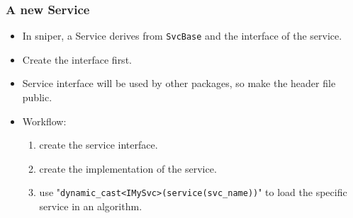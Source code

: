 
\begin{frame}
    \frametitle{A new Service}
    \begin{itemize}
        \item In sniper, a Service derives from {\tt SvcBase} and 
                the interface of the service.
        \item Create the interface first. 
        \item Service interface will be used by other packages, so make the 
                header file public.
        \item Workflow:
        \begin{enumerate}
            \item create the service interface.
            \item create the implementation of the service.
            \item use "{\tt dynamic\_cast<IMySvc>(service(svc\_name))}"
                  to load the specific service in an algorithm.
        \end{enumerate}
    \end{itemize}
\end{frame}
